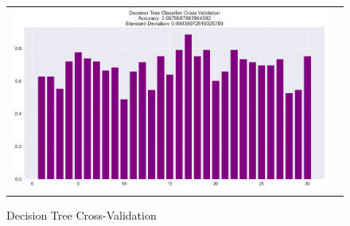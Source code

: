 \documentclass[conference]{IEEEtran}
\begin{document}
\begin{figure}[!h]
	\centering
	\begin{center}
		\begin{tabular}{cc}
			\includegraphics[scale=0.225]{pictures/pic_21.png}&
		\end{tabular}
	\end{center}
	\caption{Decision Tree Cross-Validation}
	\label{fig:21}
\end{figure}
\end{document}
